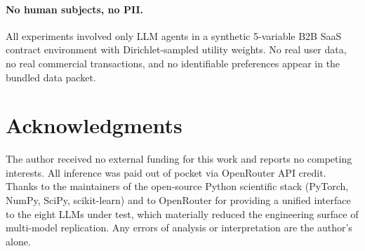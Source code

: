\documentclass[11pt,a4paper]{article}
\begin{document}
\paragraph{No human subjects, no PII.} All experiments involved only LLM agents in a synthetic 5-variable B2B SaaS contract environment with Dirichlet-sampled utility weights. No real user data, no real commercial transactions, and no identifiable preferences appear in the bundled data packet.

\section*{Acknowledgments}

The author received no external funding for this work and reports no competing interests. All inference was paid out of pocket via OpenRouter API credit. Thanks to the maintainers of the open-source Python scientific stack (PyTorch, NumPy, SciPy, scikit-learn) and to OpenRouter for providing a unified interface to the eight LLMs under test, which materially reduced the engineering surface of multi-model replication. Any errors of analysis or interpretation are the author's alone.

\end{document}
